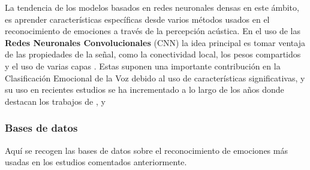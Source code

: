 \documentclass[11pt,a4paper,spanish]{book}
\begin{document}
	La tendencia de los modelos basados en redes neuronales densas en este ámbito, es aprender características específicas desde varios métodos usados en el reconocimiento de emociones a través de la percepción acústica. En el uso de las \textbf{Redes Neuronales Convolucionales} (CNN) la idea principal es tomar ventaja de las propiedades de la señal, como la conectividad local, los pesos compartidos y el uso de varias capas  \cite{Lim2017}. Estas suponen una importante contribución en la Clasificación Emocional de la Voz debido al uso de características significativas, y su uso en recientes estudios se ha incrementado a lo largo de los años donde destacan los trabajos de \cite{AbdulQayyum2019}, \cite{Anvarjon2020} y %
	
	\subsubsection{Bases de datos}
	Aquí se recogen las bases de datos sobre el reconocimiento de emociones más usadas en los estudios comentados anteriormente.
	
\end{document}
